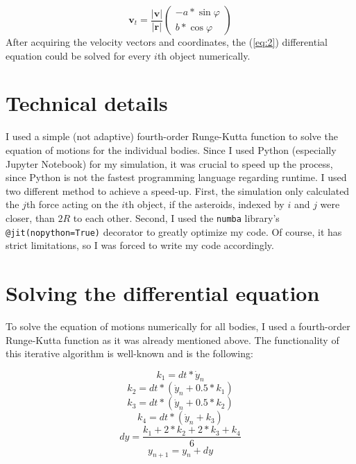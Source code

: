 \begin{multicols}{2}
\begin{equation} \label{eq:10}
\boldsymbol{v}_{t}
=
\frac{\left| \boldsymbol{v} \right|}{\left| \boldsymbol{r} \right|}
\begin{pmatrix}
-a * \sin{\varphi} \\
b * \cos{\varphi}
\end{pmatrix}
\end{equation}
After acquiring the velocity vectors and coordinates, the (\ref{eq:2}) differential equation could be solved for every $i$th object numerically.

\section{Technical details}
I used a simple (not adaptive) fourth-order Runge-Kutta function to solve the equation of motions for the individual bodies. Since I used Python (especially Jupyter Notebook) for my simulation, it was crucial to speed up the process, since Python is not the fastest programming language regarding runtime. I used two different method to achieve a speed-up. First, the simulation only calculated the $j$th force acting on the $i$th object, if the asteroids, indexed by $i$ and $j$ were closer, than $2R$ to each other. Second, I used the \texttt{numba} library's \texttt{@jit(nopython=True)} decorator to greatly optimize my code. Of course, it has strict limitations, so I was forced to write my code accordingly.

\section{Solving the differential equation}
To solve the equation of motions numerically for all bodies, I used a fourth-order Runge-Kutta function as it was already mentioned above. The functionality of this iterative algorithm is well-known and is the following:

\begin{equation}
k_{1} = dt * \dot{y}_{n}
\end{equation}
\begin{equation}
k_{2} = dt * \left( \dot{y}_{n} + 0.5 * k_1 \right)
\end{equation}
\begin{equation}
k_{3} = dt * \left( \dot{y}_{n} + 0.5 * k_2 \right)
\end{equation}
\begin{equation}
k_{4} = dt * \left( \dot{y}_{n} + k_3 \right)
\end{equation}
\begin{equation}
dy = \frac{k_{1} + 2 * k_{2} + 2 * k_{3} + k_{4}}{6}
\end{equation}
\begin{equation}
y_{n+1} = y_{n} + dy
\end{equation}


\end{multicols}